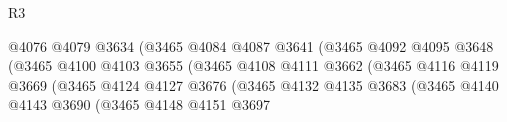 \begin{lexlean}{R3}
\begin{coremodule}
                                                    @4076
                                                    @4079
                                                    @3634
                                                    (@3465
                                                      @4084
                                                      @4087
                                                      @3641
                                                      (@3465
                                                        @4092
                                                        @4095
                                                        @3648
                                                        (@3465
                                                          @4100
                                                          @4103
                                                          @3655
                                                          (@3465
                                                            @4108
                                                            @4111
                                                            @3662
                                                            (@3465
                                                              @4116
                                                              @4119
                                                              @3669
                                                              (@3465
                                                                @4124
                                                                @4127
                                                                @3676
                                                                (@3465
                                                                  @4132
                                                                  @4135
                                                                  @3683
                                                                  (@3465
                                                                    @4140
                                                                    @4143
                                                                    @3690
                                                                    (@3465
                                                                      @4148
                                                                      @4151
                                                                      @3697

\end{coremodule}
\end{lexlean}
